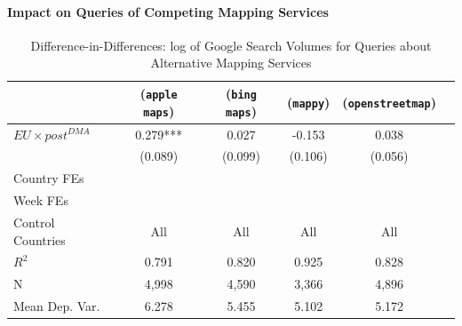 \documentclass[11pt]{article}
\begin{document}
	\clearpage
	
	\paragraph{Impact on Queries of Competing Mapping Services}
	
	\clearpage
	
	
	
	\begin{table}
		\centering
		\def\sym#1{\ifmmode^{#1}\else\(^{#1}\)\fi}
		\caption{\label{tab:did_competitor} Difference-in-Differences: log of  Google Search Volumes for Queries about Alternative Mapping Services}
		\begin{threeparttable}
			\begin{tabular}{lccccc}
				\hline \noalign{\smallskip} 
				
				&(\texttt{apple maps})   &(\texttt{bing maps})   &(\texttt{mappy})   &(\texttt{openstreetmap})   \\
				\midrule
				$ EU \times post^{DMA} $ &       0.279***&       0.027   &      -0.153   &       0.038   \\
				&     (0.089)   &     (0.099)   &     (0.106)   &     (0.056)   \\
				
				Country FEs         &  \checkmark   &  \checkmark   &  \checkmark   &  \checkmark   \\
				Week FEs            &  \checkmark   &  \checkmark   &  \checkmark   &  \checkmark   \\
				Control Countries   &         All   &         All   &         All   &         All   \\
				$ R ^2 $            &       0.791   &       0.820   &       0.925   &       0.828   \\
				N                   &       4,998   &       4,590   &       3,366   &       4,896   \\
				Mean Dep. Var.      &       6.278   &       5.455   &       5.102   &       5.172   \\
				\midrule
				
			\end{tabular}
			

\end{threeparttable}
\end{table}
\end{document}
